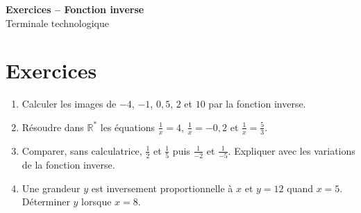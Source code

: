 \documentclass[french,11pt]{book}
\begin{document}
\begin{center}
{\Large \textbf{Exercices -- Fonction inverse}}\\[2mm]
Terminale technologique
\end{center}

\section*{Exercices}
\begin{enumerate}
  \item Calculer les images de $-4$, $-1$, $0,5$, $2$ et $10$ par la fonction inverse.
  \item Résoudre dans $\mathbb{R}^*$ les équations $\frac{1}{x}=4$, $\frac{1}{x}=-0,2$ et $\frac{1}{x}=\frac{5}{3}$.
  \item Comparer, sans calculatrice, $\frac{1}{2}$ et $\frac{1}{5}$ puis $\frac{1}{-2}$ et $\frac{1}{-5}$. Expliquer avec les variations de la fonction inverse.
  \item Une grandeur $y$ est inversement proportionnelle à $x$ et $y=12$ quand $x=5$. Déterminer $y$ lorsque $x=8$.
\end{enumerate}
\end{document}
